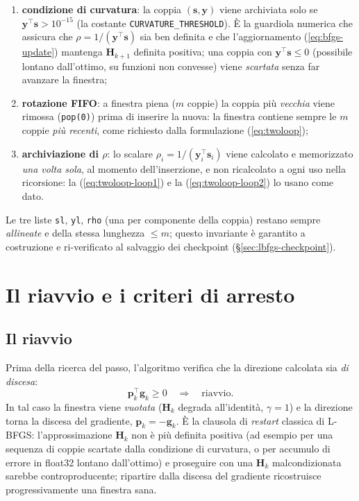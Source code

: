 \begin{enumerate}
\item \textbf{condizione di curvatura}: la coppia $(\bm{s},\bm{y})$ viene
  archiviata solo se $\bm{y}^{\!\top}\bm{s} > 10^{-15}$ (la costante
  \texttt{CURVATURE\_THRESHOLD}). È la guardiola numerica che assicura
  che $\rho = 1/(\bm{y}^{\!\top}\bm{s})$ sia ben definita e che
  l'aggiornamento (\ref{eq:bfgs-update}) mantenga
  $\bm{H}_{k+1}$ definita positiva; una coppia con
  $\bm{y}^{\!\top}\bm{s} \le 0$ (possibile lontano dall'ottimo, su funzioni
  non convesse) viene \emph{scartata} senza far avanzare la finestra;
\item \textbf{rotazione FIFO}: a finestra piena ($m$ coppie) la coppia più
  \emph{vecchia} viene rimossa (\texttt{pop(0)}) prima di inserire la
  nuova: la finestra contiene sempre le $m$ coppie \emph{più recenti},
  come richiesto dalla formulazione (\ref{eq:twoloop});
\item \textbf{archiviazione di $\rho$}: lo scalare
  $\rho_i = 1/(\bm{y}_i^{\!\top}\bm{s}_i)$ viene calcolato e memorizzato
  \emph{una volta sola}, al momento dell'inserzione, e non ricalcolato a
  ogni uso nella ricorsione: la (\ref{eq:twoloop-loop1}) e la
  (\ref{eq:twoloop-loop2}) lo usano come dato.
\end{enumerate}

Le tre liste \texttt{sl}, \texttt{yl}, \texttt{rho} (una per componente
della coppia) restano sempre \emph{allineate} e della stessa lunghezza
$\le m$; questo invariante è garantito a costruzione e ri-verificato al
salvaggio dei checkpoint (\/\S\ref{sec:lbfgs-checkpoint}).

\section{Il riavvio e i criteri di arresto}
\label{sec:lbfgs-restart}

\subsection{Il riavvio}

Prima della ricerca del passo, l'algoritmo verifica che la direzione
calcolata sia \emph{di discesa}:
\begin{equation}
\bm{p}_k^{\!\top}\bm{g}_k \ge 0
\quad\Longrightarrow\quad
\text{riavvio}.
\end{equation}
In tal caso la finestra viene \emph{vuotata} ($\bm{H}_k$ degrada
all'identità, $\gamma = 1$) e la direzione torna la discesa del gradiente,
$\bm{p}_k = -\bm{g}_k$. È la clausola di \emph{restart} classica di L-BFGS:
l'approssimazione $\bm{H}_k$ non è più definita positiva (ad esempio per
una sequenza di coppie scartate dalla condizione di curvatura, o per
accumulo di errore in float32 lontano dall'ottimo) e proseguire con una
$\bm{H}_k$ malcondizionata sarebbe controproducente; ripartire dalla
discesa del gradiente ricostruisce progressivamente una finestra sana.

